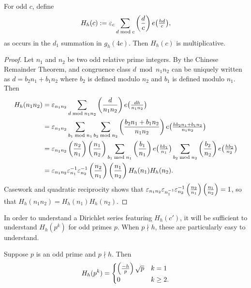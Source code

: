 \begin{lemma}\label{lem:back:Hh_multiplicative}
  For odd $c$, define
  \begin{equation}
    H_h(c) := \varepsilon_c \sum_{d \bmod c} \left(\frac{d}{c}\right) e \big( \tfrac{h d}{c} \big),
  \end{equation}
  as occurs in the $d_1$ summation in $g_h(4c)$.
  Then $H_h(c)$ is multiplicative.
\end{lemma}


\begin{proof}


Let $n_1$ and $n_2$ be two odd relative prime integers.
By the Chinese Remainder Theorem, and congruence class $d \bmod n_1 n_2$ can be uniquely
written as $d = b_2 n_1 + b_1 n_2$ where $b_2$ is defined modulo $n_2$ and $b_1$ is
defined modulo $n_1$.
Then
\begin{align}
  H_h(n_1 n_2)
  &=
  \varepsilon_{n_1 n_2} \sum_{d \bmod n_1n_2} \left(\frac{d}{n_1n_2}\right)
  e\big(\tfrac{d h}{n_1 n_2} \big)
  \\
  &= \varepsilon_{n_1 n_2} \sum_{b_1 \bmod n_1} \sum_{b_2 \bmod n_2}
  \left(\frac{b_2 n_1 +b_1 n_2}{n_1 n_2}\right)  e \big( \tfrac{h b_2 n_1 +b_1 n_2}{n_1 n_2} \big)
  \\
  &= \varepsilon_{n_1 n_2}\left(\frac{n_2}{n_1}\right) \left(\frac{n_1}{n_2}\right)
  \sum_{b_1 \bmod n_1} \left(\frac{b_1}{n_1}\right) e\big( \tfrac{h b_1}{n_1} \big)
  \sum_{b_2 \bmod n_2} \left(\frac{b_2}{n_2}\right) e\big( \tfrac{h b_2}{n_2} \big)
  \\
  &= \varepsilon_{n_1 n_2} \varepsilon_{n_1}^{-1} \varepsilon_{n_2}^{-1}
  \left(\frac{n_2}{n_1}\right) \left(\frac{n_1}{n_2}\right) H_h(n_1) H_{h}(n_2).
\end{align}
Casework and quadratic reciprocity shows that
$\varepsilon_{n_1n_2} \varepsilon_{n_1^{-1}} \varepsilon_{n_2}^{-1}
\left(\frac{n_2}{n_1}\right)\left(\frac{n_1}{n_2}\right)= 1$,
so that $H_h(n_1 n_2) = H_h(n_1) H_h(n_2)$.
%
\end{proof}


In order to understand a Dirichlet series featuring $H_h(c')$, it will be sufficient to
understand $H_h(p^k)$ for odd primes $p$.
When $p \nmid h$, these are particularly easy to understand.


\begin{lemma}\label{lem:back:Hh_goodp_eval}
  Suppose $p$ is an odd prime and $p \nmid h$.
  Then
  \begin{equation}
    H_h(p^k) = \begin{cases}
      \left(\frac{-h}{p}\right) \sqrt p & k = 1 \\
      0 & k \geq 2.
    \end{cases}
  \end{equation}
\end{lemma}


